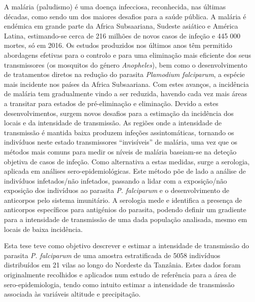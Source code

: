 
\begin{resumo}

A malária (paludismo) é uma doença infecciosa, reconhecida, nas últimas décadas, como sendo um dos maiores desafios para a saúde pública.
A malária é endémica em grande parte da Africa Subsaariana, Sudeste asiático e América Latina, estimando-se cerca de 216 milhões de novos casos de infeção e 445 000 mortes, só em 2016.
Os estudos produzidos nos últimos anos têm permitido abordagens efetivas para o controlo e para uma eliminação mais eficiente dos seus transmissores (os mosquitos do género \textit{Anopheles}), bem como o desenvolvimento de tratamentos diretos na redução do parasita \textit{Plamodium falciparum}, a espécie mais incidente nos países da Africa Subsaariana.
Com estes avanços, a incidência de malária tem gradualmente vindo a ser reduzida, havendo cada vez mais áreas a transitar para estados de pré-eliminação e eliminação.
Devido a estes desenvolvimentos, surgem novos desafios para a estimação da incidência dos locais e da intensidade de transmissão.
As regiões onde a intensidade de transmissão é mantida baixa produzem infeções assintomáticas, tornando os indivíduos neste estado transmissores “invisíveis” de malária, uma vez que os métodos mais comuns para medir os níveis de malária baseiam-se na deteção objetiva de casos de infeção.
Como alternativa a estas medidas, surge a serologia, aplicada em análises sero-epidemiológicas.
Este método põe de lado a análise de indivíduos infetados/não infetados, passando a lidar com a exposição/não exposição dos indivíduos ao parasita \textit{P. falciparum} e o desenvolvimento de anticorpos pelo sistema imunitário.
A serologia mede e identifica a presença de anticorpos específicos para antigénios do parasita, podendo definir um gradiente para a intensidade de transmissão de uma dada população analisada, mesmo em locais de baixa incidência.

Esta tese teve como objetivo descrever e estimar a intensidade de transmissão do parasita \textit{P. falciparum} de uma amostra estratificada de 5058 indivíduos distribuídos em 21 vilas ao longo do Nordeste da Tanzânia.
Estes dados foram originalmente recolhidos e aplicados num estudo de referência para a área de sero-epidemiologia, tendo como intuito estimar a intensidade de transmissão associada às variáveis altitude e precipitação.


\end{resumo}

